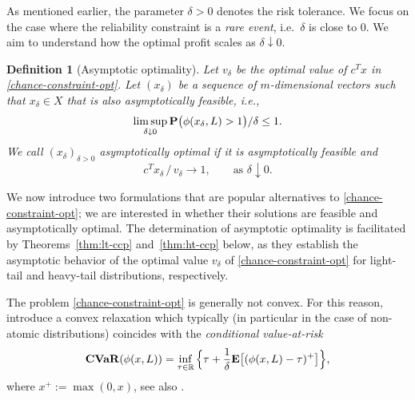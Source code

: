 \documentclass[a4paper, a4wide, 10pt, reqno]{amsart}
\theoremstyle{plain}
\newtheorem{definition}{Definition}
\begin{document}
\smallskip
As mentioned earlier, the parameter $\delta> 0$ denotes the risk tolerance. 
We focus on the case where the reliability constraint is a {\em rare event}, i.e.\ $\delta$ is close to $0$.
We aim to understand how the optimal profit 
scales as $\delta\downarrow 0$. 

\begin{definition}[Asymptotic optimality]
Let $v_\delta$ be the optimal value of $c^Tx$ in \eqref{chance-constraint-opt}. Let $(x_\delta)$ be a sequence of $m$-dimensional vectors such that $x_\delta\in X$ that is also asymptotically feasible, i.e., 
\begin{equation}
\label{asymptotic-feasibility}
    \limsup_{\delta\downarrow 0}
     {\bf P}\big(\phi(x_\delta,L) > 1
     \big)/\delta \leq 1. 
\end{equation}
We call $(x_\delta)_{\delta>0}$ asymptotically optimal if it is asymptotically feasible and
\begin{equation}
    \label{asymptotic-optimality}
    c^T x_\delta\, \big/\, v_\delta\rightarrow 1,\qquad \text{as }\delta\downarrow 0.
\end{equation}  
\end{definition}

We now introduce two formulations that are  
popular alternatives to \eqref{chance-constraint-opt}; we are interested in whether their solutions are feasible and asymptotically optimal. The determination of asymptotic optimality is facilitated by
Theorems~\ref{thm:lt-ccp} and~\ref{thm:ht-ccp} below, as they establish the asymptotic behavior of the optimal value $v_\delta$ of \eqref{chance-constraint-opt} for light-tail and heavy-tail distributions, respectively.



\medskip 
{} The problem \eqref{chance-constraint-opt} is generally not convex. 
For this reason,  
 \cite{nemirovski2006convex} 
introduce a convex relaxation which typically (in particular in the case of non-atomic distributions) coincides with the {\em conditional value-at-risk} 
\begin{equation}
\label{cvar}
{\bf CVaR} (\phi(x,L))=    \inf_{\tau \in {\mathbb{R}}} \Big\{\tau + \frac 1\delta {\bf E}\big[(\phi(x,L)-\tau)^+\big]\Big\},
\end{equation}
where $x^+:=\max(0, x)$, see also \cite{RockUry02}.
\end{document}
